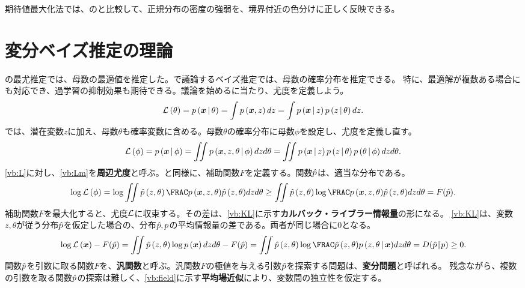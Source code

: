 \documentclass[10pt,a4paper]{book}
\begin{document}
期待値最大化法では、の\kmean{}と比較して、正規分布の密度の強弱を、境界付近の色分けに正しく反映できる。

\section{変分ベイズ推定の理論\label{sect:vb}}

の最尤推定では、母数の最適値を推定した。で議論するベイズ推定では、母数の確率分布を推定できる。
特に、最適解が複数ある場合にも対応でき、過学習の抑制効果も期待できる。議論を始めるに当たり、尤度を定義しよう。
%
\begin{equation}
\label{eq:vb:L}
\Lk{\theta} =
\prob{\bm{x}}[\theta] =
\int \prob{\bm{x},z} dz =
\int \prob{\bm{x}}[z] \prob{z}[\theta] dz.
\end{equation}
%
では、潜在変数$z$に加え、母数$\theta$も確率変数に含める。母数$\theta$の確率分布に母数$\phi$を設定し、尤度を定義し直す。
%
\begin{equation}
\label{eq:vb:Lm}
\Lk{\phi} =
\prob{\bm{x}}[\phi] =
\iint \prob{\bm{x},z,\theta}[\phi] dz d\theta =
\iint \prob{\bm{x}}[z] \prob{z}[\theta] \prob{\theta}[\phi] dz d\theta.
\end{equation}
%
\eqref{vb:L}に対し、\eqref{vb:Lm}を\textbf{周辺尤度}と呼ぶ。と同様に、補助関数$F$を定義する。関数$\hat{p}$は、適当な分布である。
%
\begin{equation}
\log \Lk{\phi} =
\log \iint \hatprob{z,\theta} \frac{\prob{\bm{x},z,\theta}}{\hatprob{z,\theta}} dz d\theta \geq
\iint \hatprob{z,\theta} \log \frac{\prob{\bm{x},z,\theta}}{\hatprob{z,\theta}} dz d\theta = F(\hatp).
\end{equation}
%
補助関数$F$を最大化すると、尤度$\mathcal{L}$に収束する。その差は、\eqref{vb:KL}に示す\textbf{カルバック・ライブラー情報量}の形になる。
\eqref{vb:KL}は、変数$z,\theta$が従う分布$\hat{p}$を仮定した場合の、分布$\hat{p},p$の平均情報量の差である。両者が同じ場合に$0$となる。
%
\begin{equation}
\label{eq:vb:KL}
\log \Lk{\bm{x}} - F(\hatp) =
\iint \hatprob{z,\theta} \log \prob{\bm{x}} dz d\theta - F(\hatp) =
\iint \hatprob{z,\theta} \log \frac{\hatprob{z,\theta}}{\prob{z,\theta}[\bm{x}]} dz d\theta =
\KL{\hatp}{p} \geq 0.
\end{equation}
%
関数$\hat{p}$を引数に取る関数$F$を、\textbf{汎関数}と呼ぶ。汎関数$F$の極値を与える引数$\hat{p}$を探索する問題は、\textbf{変分問題}と呼ばれる。
残念ながら、複数の引数を取る関数$\hat{p}$の探索は難しく、\eqref{vb:field}に示す\textbf{平均場近似}により、変数間の独立性を仮定する。
\end{document}

